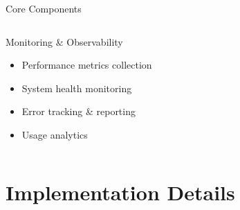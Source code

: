 \documentclass[aspectratio=169]{beamer}
\begin{document}
\begin{frame}{Core Components}
\begin{columns}[c]
\begin{column}{0.5\textwidth}
            \begin{block}{Monitoring \& Observability}
                \begin{itemize}
                    \item Performance metrics collection
                    \item System health monitoring
                    \item Error tracking \& reporting
                    \item Usage analytics
                \end{itemize}
            \end{block}
        \end{column}
    \end{columns}
\end{frame}

\section{Implementation Details}
\end{document}
